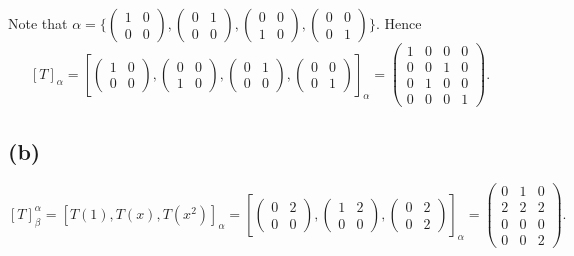 \documentclass[12pt]{article}%
\begin{document}
Note that $\alpha=\{\begin{pmatrix} 1& 0 \\0 & 0\end{pmatrix},\begin{pmatrix} 0& 1 \\0 & 0\end{pmatrix},\begin{pmatrix} 0 & 0 \\1 & 0\end{pmatrix},\begin{pmatrix} 0& 0 \\0 & 1\end{pmatrix}\}.$ Hence $$[T]_\alpha=[\begin{pmatrix}1&0\\0&0\end{pmatrix},\begin{pmatrix}0&0\\1&0\end{pmatrix},\begin{pmatrix}0&1\\0&0\end{pmatrix},\begin{pmatrix}0&0\\0&1\end{pmatrix}]_\alpha=\begin{pmatrix}1&0&0&0\\0&0&1&0\\0&1&0&0\\0&0&0&1\end{pmatrix}.$$

\subsection{(b)}

$[T]_\beta^{\alpha}=[T(1),T(x),T(x^2)]_{\alpha}=[\begin{pmatrix}0&2\\0&0\end{pmatrix},\begin{pmatrix}1&2\\0&0\end{pmatrix},\begin{pmatrix}0&2\\0&2\end{pmatrix}]_\alpha=\begin{pmatrix}0&1&0\\2&2&2\\0&0&0\\0&0&2\end{pmatrix}.$
\end{document}
